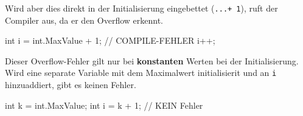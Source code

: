 \documentclass[
  10pt,
  a4paperpaper,
  DIV=11,
  numbers=noendperiod]{scrartcl}
\newenvironment{Shaded}{}{}
\newcommand{\CommentTok}[1]{\textcolor[rgb]{0.42,0.45,0.49}{#1}}
\newcommand{\DataTypeTok}[1]{\textcolor[rgb]{0.84,0.23,0.29}{#1}}
\newcommand{\DecValTok}[1]{\textcolor[rgb]{0.00,0.36,0.77}{#1}}
\newcommand{\FunctionTok}[1]{\textcolor[rgb]{0.44,0.26,0.76}{#1}}
\newcommand{\NormalTok}[1]{\textcolor[rgb]{0.14,0.16,0.18}{#1}}
\newcommand{\OperatorTok}[1]{\textcolor[rgb]{0.14,0.16,0.18}{#1}}
\begin{document}
\begin{multicols}{2}
Wird aber dies direkt in der Initialisierung eingebettet
(\texttt{...+\ 1}), ruft der Compiler aus, da er den Overflow erkennt.

\begin{Shaded}
\begin{Highlighting}[]
\DataTypeTok{int}\NormalTok{ i }\OperatorTok{=} \DataTypeTok{int}\OperatorTok{.}\FunctionTok{MaxValue} \OperatorTok{+} \DecValTok{1}\OperatorTok{;} \CommentTok{// COMPILE{-}FEHLER}
\NormalTok{i}\OperatorTok{++;}
\end{Highlighting}
\end{Shaded}

\begin{tcolorbox}[enhanced jigsaw, bottomrule=.15mm, title=\textcolor{quarto-callout-caution-color}{\faFire}\hspace{0.5em}{Danger}, toprule=.15mm, colback=white, coltitle=black, colbacktitle=quarto-callout-caution-color!10!white, titlerule=0mm, toptitle=1mm, bottomtitle=1mm, colframe=quarto-callout-caution-color-frame, leftrule=.75mm, rightrule=.15mm, opacityback=0, breakable, left=2mm, opacitybacktitle=0.6, arc=.35mm]

Dieser Overflow-Fehler gilt nur bei \textbf{konstanten} Werten bei der
Initialisierung. Wird eine separate Variable mit dem Maximalwert
initialisierit und an \texttt{i} hinzuaddiert, gibt es keinen Fehler.

\begin{Shaded}
\begin{Highlighting}[]
\DataTypeTok{int}\NormalTok{ k }\OperatorTok{=} \DataTypeTok{int}\OperatorTok{.}\FunctionTok{MaxValue}\OperatorTok{;}
\DataTypeTok{int}\NormalTok{ i }\OperatorTok{=}\NormalTok{ k }\OperatorTok{+} \DecValTok{1}\OperatorTok{;} \CommentTok{// KEIN Fehler}
\end{Highlighting}
\end{Shaded}

\end{tcolorbox}

\end{multicols}
\end{document}

